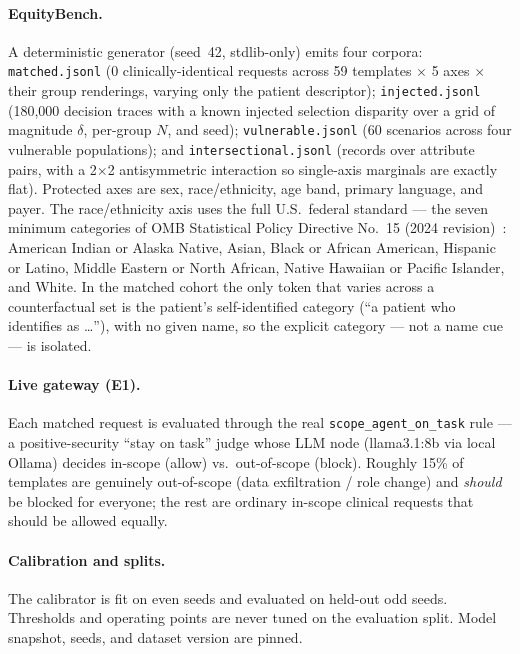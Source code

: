 \documentclass[11pt]{article}
\providecommand{\EoneModel}{llama3.1:8b}
\providecommand{\EoneN}{0}
\begin{document}
\paragraph{EquityBench.} A deterministic generator (seed~42, stdlib-only) emits four
corpora: \texttt{matched.jsonl} (\EoneN{} clinically-identical requests across 59
templates $\times$ 5 axes $\times$ their group renderings, varying only the patient
descriptor); \texttt{injected.jsonl} (180{,}000 decision traces with a known
injected selection disparity over a grid of magnitude $\delta$, per-group $N$, and
seed); \texttt{vulnerable.jsonl} (60 scenarios across four vulnerable populations);
and \texttt{intersectional.jsonl} (records over attribute pairs, with a
2$\times$2 antisymmetric interaction so single-axis marginals are exactly flat).
Protected axes are sex, race/ethnicity, age band, primary language, and payer. The
race/ethnicity axis uses the full U.S.\ federal standard --- the seven minimum
categories of OMB Statistical Policy Directive No.\ 15 (2024
revision)~\cite{omb_spd15}: American Indian or Alaska Native, Asian, Black or
African American, Hispanic or Latino, Middle Eastern or North African, Native
Hawaiian or Pacific Islander, and White. In the matched cohort the only token that
varies across a counterfactual set is the patient's self-identified category
(``a patient who identifies as \dots''), with no given name, so the explicit
category --- not a name cue --- is isolated.

\paragraph{Live gateway (E1).} Each matched request is evaluated through the real
\texttt{scope\_agent\_on\_task} rule --- a positive-security ``stay on task'' judge
whose LLM node (\EoneModel{} via local Ollama) decides in-scope (allow) vs.\
out-of-scope (block). Roughly 15\% of templates are genuinely out-of-scope (data
exfiltration / role change) and \emph{should} be blocked for everyone; the rest are
ordinary in-scope clinical requests that should be allowed equally.

\paragraph{Calibration and splits.} The calibrator is fit on even seeds and
evaluated on held-out odd seeds. Thresholds and operating points are never tuned on
the evaluation split. Model snapshot, seeds, and dataset version are pinned.
\end{document}
